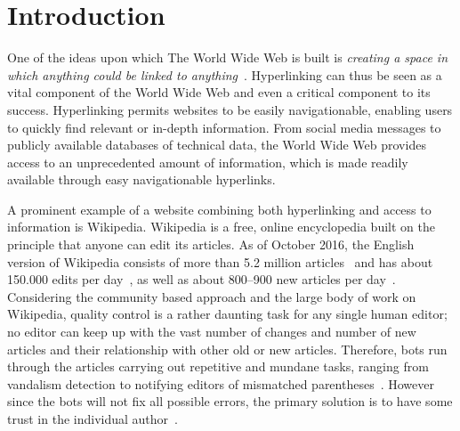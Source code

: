 \chapter{Introduction}
\label{ch:introduction}
One of the ideas upon which The World Wide Web is built is \emph{creating a space in which anything could be linked to anything}~\cite[ch.~1, p.~4]{Weaving-the-web}. Hyperlinking can thus be seen as a vital component of the World Wide Web and even a critical component to its success. Hyperlinking permits websites to be easily navigationable, enabling users to quickly find relevant or in-depth information. From social media messages to publicly available databases of technical data, the World Wide Web provides access to an unprecedented amount of information, which is made readily available through easy navigationable hyperlinks.

A prominent example of a website combining both hyperlinking and access to information is Wikipedia. Wikipedia is a free, online encyclopedia built on the principle that anyone can edit its articles. As of October 2016, the English version of Wikipedia consists of more than 5.2 million articles~\cite{wiki-about} and has about 150.000 edits per day~\cite{wiki-num-edits}, as well as about 800--900 new articles per day~\cite{wmcharts}. Considering the community based approach and the large body of work on Wikipedia, quality control is a rather daunting task for any single human editor; no editor can keep up with the vast number of changes and number of new articles and their relationship with other old or new articles. Therefore, bots run through the articles carrying out repetitive and mundane tasks, ranging from vandalism detection to notifying editors of mismatched parentheses~\cite{wiki-bots}. However since the bots will not fix all possible errors, the primary solution is to have some trust in the individual author~\cite{wiki-editor-guidelines}.

